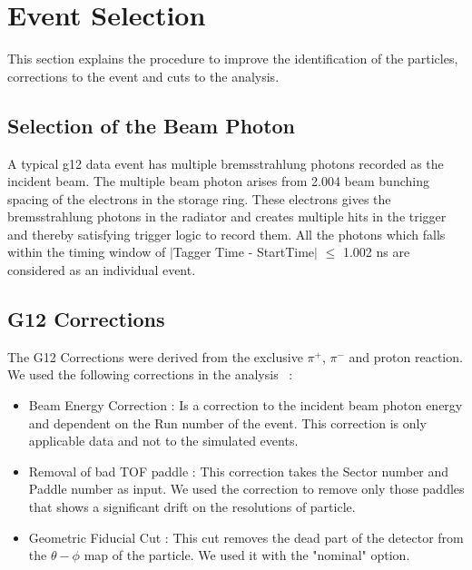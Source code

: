 \section{Event Selection}

This section explains the procedure to improve the identification of the particles, corrections to the event and cuts to the analysis. 

\subsection{Selection of the Beam Photon}

A typical g12 data event has multiple bremsstrahlung photons recorded as the incident beam. The multiple beam photon arises from 2.004 beam bunching spacing of the electrons in the storage ring. These electrons gives the bremsstrahlung photons in the radiator and creates multiple hits in the trigger and thereby satisfying trigger logic to record them. All the  photons which falls within the timing window of $\mid$Tagger Time - StartTime$\mid$ $\leq$ 1.002 ns are considered as an individual event.

\subsection{G12 Corrections}
\label{Cor}
The G12 Corrections were derived from the exclusive $\pi^{+}$, $\pi^{-}$ and proton reaction. We used the following corrections in the analysis ~\cite{G12_AN}:
    
\begin {itemize}
\item Beam Energy Correction : Is a correction to the incident beam photon energy and dependent on the Run number of the event. This correction is only applicable data and not to the simulated events.
\item Removal of bad TOF paddle : This correction takes the Sector number and Paddle number as input. We used the correction to remove only those paddles that shows a significant drift on the resolutions of particle.   
\item  Geometric Fiducial Cut : This cut removes the dead part of the detector from the $\theta-\phi$ map of the particle. We used it with the "nominal" option. 
\end {itemize}

